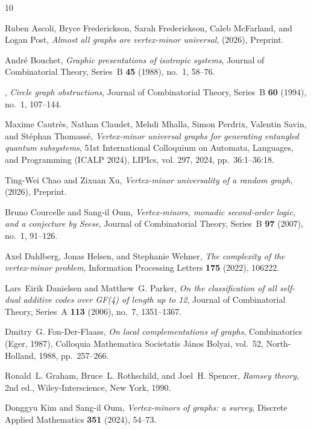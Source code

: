 \documentclass[11pt]{amsart}
\theoremstyle{definition}
\theoremstyle{remark}
\begin{document}
\begin{thebibliography}{10}

Ruben Ascoli, Bryce Frederickson, Sarah Frederickson, Caleb McFarland, and
  Logan Post, \emph{Almost all graphs are vertex-minor universal},  (2026),
  Preprint.

Andr\'{e} Bouchet, \emph{Graphic presentations of isotropic systems}, Journal
  of Combinatorial Theory, Series~B \textbf{45} (1988), no.~1, 58--76.

\bysame, \emph{Circle graph obstructions}, Journal of Combinatorial Theory,
  Series~B \textbf{60} (1994), no.~1, 107--144.

Maxime Cautr\`{e}s, Nathan Claudet, Mehdi Mhalla, Simon Perdrix, Valentin
  Savin, and St\'{e}phan Thomass\'{e}, \emph{Vertex-minor universal graphs for
  generating entangled quantum subsystems}, 51st International Colloquium on
  Automata, Languages, and Programming (ICALP 2024), LIPIcs, vol. 297, 2024,
  pp.~36:1--36:18.

Ting-Wei Chao and Zixuan Xu, \emph{Vertex-minor universality of a random
  graph},  (2026), Preprint.

Bruno Courcelle and Sang-il Oum, \emph{Vertex-minors, monadic second-order
  logic, and a conjecture by {S}eese}, Journal of Combinatorial Theory,
  Series~B \textbf{97} (2007), no.~1, 91--126.

Axel Dahlberg, Jonas Helsen, and Stephanie Wehner, \emph{The complexity of the
  vertex-minor problem}, Information Processing Letters \textbf{175} (2022),
  106222.

Lars~Eirik Danielsen and Matthew~G. Parker, \emph{On the classification of all
  self-dual additive codes over {GF}(4) of length up to 12}, Journal of
  Combinatorial Theory, Series~A \textbf{113} (2006), no.~7, 1351--1367.

Dmitry~G. Fon-Der-Flaass, \emph{On local complementations of graphs},
  Combinatorics ({E}ger, 1987), Colloquia Mathematica Societatis J\'{a}nos
  Bolyai, vol.~52, North-Holland, 1988, pp.~257--266.

Ronald~L. Graham, Bruce~L. Rothschild, and Joel~H. Spencer, \emph{Ramsey
  theory}, 2nd ed., Wiley-Interscience, New York, 1990.

Donggyu Kim and Sang-il Oum, \emph{Vertex-minors of graphs: a survey}, Discrete
  Applied Mathematics \textbf{351} (2024), 54--73.


\end{thebibliography}
\end{document}
